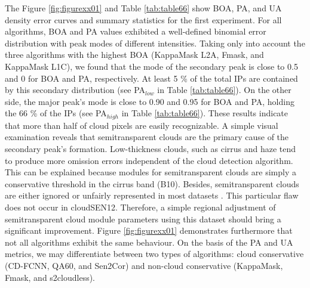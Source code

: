 \documentclass[a4paper, nobind]{templates/cdethesis}
\begin{document}
The Figure \ref{fig:figurexx01} and Table \ref{tab:table66} show BOA, PA, and UA density error curves and summary statistics for the first experiment. For all algorithms, BOA and PA values exhibited a well-defined binomial error distribution with peak modes of different intensities. Taking only into account the three algorithms with the highest BOA (KappaMask L2A, Fmask, and KappaMask L1C), we found that the mode of the secondary peak is close to 0.5 and 0 for BOA and PA, respectively. At least 5 \% of the total IPs are contained by this secondary distribution (see PA\(_{low}\) in Table \ref{tab:table66}). On the other side, the major peak's mode is close to 0.90 and 0.95 for BOA and PA, holding the 66 \% of the IPs (see PA\(_{high}\) in Table \ref{tab:table66}). These results indicate that more than half of cloud pixels are easily recognizable. A simple visual examination reveals that semitransparent clouds are the primary cause of the secondary peak's formation. Low-thickness clouds, such as cirrus and haze tend to produce more omission errors independent of the cloud detection algorithm. This can be explained because modules for semitransparent clouds are simply a conservative threshold in the cirrus band (B10). Besides, semitransparent clouds are either ignored or unfairly represented in most datasets \cite{CMIX}. This particular flaw does not occur in cloudSEN12. Therefore, a simple regional adjustment of semitransparent cloud module parameters using this dataset should bring a significant improvement. Figure \ref{fig:figurexx01} demonstrates furthermore that not all algorithms exhibit the same behaviour. On the basis of the PA and UA metrics, we may differentiate between two types of algorithms: cloud conservative (CD-FCNN, QA60, and Sen2Cor) and non-cloud conservative (KappaMask, Fmask, and s2cloudless).
\end{document}
